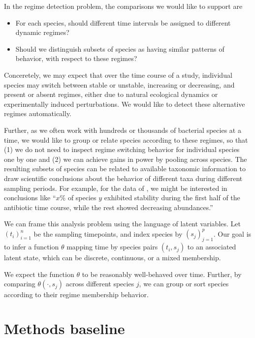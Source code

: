 \documentclass[14pt]{extarticle}
\begin{document}
In the regime detection problem, the comparisons we would like to support are
\begin{itemize}
\item For each species, should different time intervals be assigned to different
  dynamic regimes?
\item Should we distinguish subsets of species as having similar patterns of
  behavior, with respect to these regimes?
\end{itemize}

Conceretely, we may expect that over the time course of a study, individual
species may switch between stable or unstable, increasing or decreasing, and
present or absent regimes, either due to natural ecological dynamics or
experimentally induced perturbations. We would like to detect these alternative
regimes automatically.

Further, as we often work with hundreds or thousands of bacterial species at a
time, we would like to group or relate species according to these regimes, so
that (1) we do not need to inspect regime switching behavior for individual
species one by one and (2) we can achieve gains in power by pooling across
species. The resulting subsets of species can be related to available taxonomic
information to draw scientific conclusions about the behavior of different taxa
during different sampling periods. For example, for the data of
\cite{dethlefsen2011incomplete}, we might be interested in conclusions like
``$x$\% of species $y$ exhibited stability during the first half of the
antibiotic time course, while the rest showed decreasing abundances.''

We can frame this analysis problem using the language of latent variables. Let
$\left(t_{i}\right)_{i = 1}^{n}$ be the sampling timepoints, and index species
by $\left(s_{j}\right)_{j = 1}^{p}$. Our goal is to infer a function $\theta$
mapping time by species pairs $\left(t_{i}, s_{j}\right)$ to an associated
latent state, which can be discrete, continuous, or a mixed membership.

We expect the function $\theta$ to be reasonably well-behaved over time.
Further, by comparing $\theta\left(\cdot, s_{j}\right)$ across different species
$j$, we can group or sort species according to their regime membership behavior.

\section{Methods baseline}
\label{sec:baseline}
\end{document}
